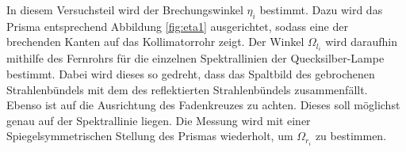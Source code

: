 In diesem Versuchsteil wird der Brechungswinkel $\eta_i$ bestimmt. Dazu wird das Prisma entsprechend Abbildung \ref{fig:eta1} ausgerichtet, sodass
eine der brechenden Kanten auf das Kollimatorrohr zeigt.
Der Winkel $\Omega_{l_i}$ wird daraufhin mithilfe des Fernrohrs für die einzelnen Spektrallinien der Quecksilber-Lampe bestimmt.
Dabei wird dieses so gedreht, dass das Spaltbild des gebrochenen Strahlenbündels mit dem des reflektierten Strahlenbündels zusammenfällt.
Ebenso ist auf die Ausrichtung des Fadenkreuzes zu achten. Dieses soll möglichst genau auf der Spektrallinie liegen.
Die Messung wird mit einer Spiegelsymmetrischen Stellung des Prismas wiederholt, um  $\Omega_{r_i}$ zu bestimmen.
